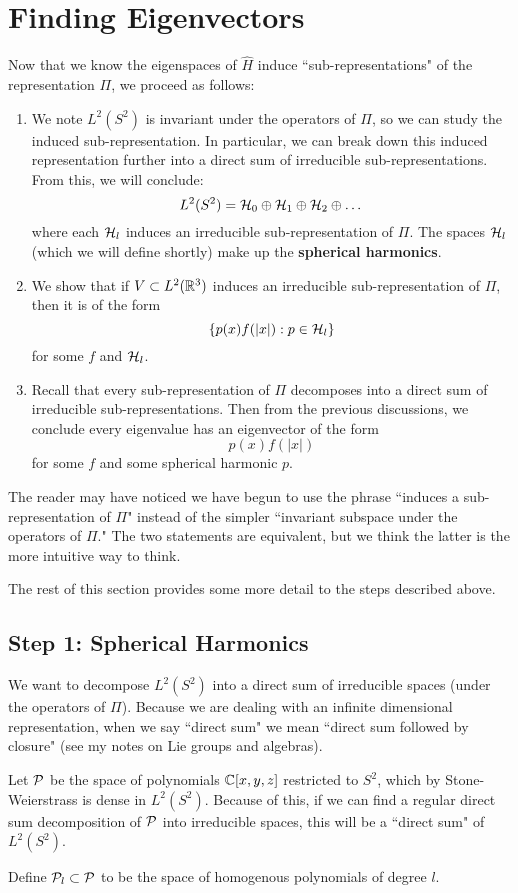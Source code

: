 \section{Finding Eigenvectors}
Now that we know the eigenspaces of $\hat{H}$ induce ``sub-representations" of the representation $\Pi$, we proceed as follows:
\begin{enumerate}
    \item We note $L^2(S^2)$ is invariant under the operators of $\Pi$, so we can study the induced sub-representation. In particular, we can break down this induced representation further into a direct sum of irreducible sub-representations. From this, we will conclude:
        \[
            L^2(S^2) = {\mathcal H}_0 \oplus {\mathcal H}_1 \oplus {\mathcal H}_2 \oplus \dots
        \]
        where each ${\mathcal H}_l$ induces an irreducible sub-representation of $\Pi$. The spaces ${\mathcal H}_l$ (which we will define shortly) make up the \textbf{spherical harmonics}.

    \item We show that if $V \subset L^2({\mathbb R}^3)$ induces an irreducible sub-representation of $\Pi$, then it is of the form
        \[
            \{p(x)f(|x|): p \in {\mathcal H}_l\}
        \]
        for some $f$ and ${\mathcal H}_l$.

    \item Recall that every sub-representation of $\Pi$ decomposes into a direct sum of irreducible sub-representations. Then from the previous discussions, we conclude every eigenvalue has an eigenvector of the form
        \[
            p(x)f(|x|)
        \]
        for some $f$ and some spherical harmonic $p$.
\end{enumerate}
The reader may have noticed we have begun to use the phrase ``induces a sub-representation of $\Pi$" instead of the simpler ``invariant subspace under the operators of $\Pi$." The two statements are equivalent, but we think the latter is the more intuitive way to think.

The rest of this section provides some more detail to the steps described above.

\subsection{Step 1: Spherical Harmonics}
We want to decompose $L^2(S^2)$ into a direct sum of irreducible spaces (under the operators of $\Pi$). Because we are dealing with an infinite dimensional representation, when we say ``direct sum" we mean ``direct sum followed by closure" (see my notes on Lie groups and algebras).

Let ${\mathcal P}$ be the space of polynomials ${\mathbb C}[x,y,z]$ restricted to $S^2$, which by Stone-Weierstrass is dense in $L^2(S^2)$. Because of this, if we can find a regular direct sum decomposition of ${\mathcal P}$ into irreducible spaces, this will be a ``direct sum" of $L^2(S^2)$.

Define ${\mathcal P}_l \subset {\mathcal P}$ to be the space of homogenous polynomials of degree $l$.
